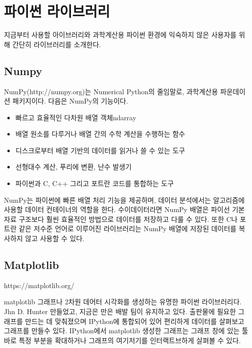 
\section{파이썬 라이브러리}

지금부터 사용할 아이브러리와 과학계산용 파이썬 환경에 익숙하지 않은 사용자를 위해 간단히 라이브러리를 소개한다.

\subsection{Numpy}

NumPy(http://numpy.org)는 Numerical Python의 줄임말로, 과학계산용 파운데이션 패키지이다. 다음은 NumPy의 기능이다.


\begin{itemize}
	\item{빠르고 효율적인 다차원 배열 객체ndarray}
	\item{배열 원소를 다루거나 배열 간의 수학 계산을 수행하는 함수}
	\item{디스크로부터 배열 기반의 데이터를 읽거나 쓸 수 있는 도구}
	\item{선형대수 계산, 푸리에 변환, 난수 발생기}
	\item{파이썬과 C, C++ 그리고 포트란 코드를 통합하는 도구}
\end{itemize}


NumPy는 파이썬에 빠른 배열 처리 기능을 제공하며, 데이터 분석에서는 알고리즘에 사용할 데이터 컨테이너의 역할을 한다. 수이데이터라면 NumPy 배열은 파이선 기본 자료 구조보다 훨씬 효율적인 방법으로 데이터를 저장하고 다룰 수 있다. 또한 C나 포트란 같은 저수준 언어로 이루어진 라이브러리는 NumPy 배열에 저장된 데이터를 복사하지 않고 사용할 수 있다. 


\subsection{Matplotlib}

https://matplotlib.org/

matplotlib \은 그래프나 2차원 데어터 시각화를 생성하는 유명한 파이썬 라이브러리다. Jhn D. Hunter \가 만들었고, 지금은 만은 배발 팀이 유지하고 있다. 출판물에 필요한 그래프를 만드는 데 맞춰졌으며 IPython에 통합되어 있어 편리하게 데이터를 살펴보고 그래프를 만들수 있다. IPython에서 matplotlib \로 생성한 그래프는 그래프 창에 있는 툴바로 특정 부분을 확대하거나 그래프의 여기저기를 인터랙트브하게 살펴볼 수 있다.


